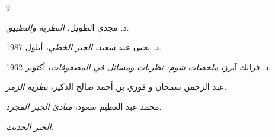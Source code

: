 \begin{thebibliography}{9}
	
	د. مجدي الطويل، \textit{النظرية والتطبيق}.
	
	د. يحيى عبد سعيد، \textit{الجبر الخطي}، أيلول 1987.
	
	د. فرانك آيرز، \textit{ملخصات شوم: نظريات ومسائل في المصفوفات}، أكتوبر 1962.
	
	عبد الرحمن سمحان و فوزي بن أحمد صالح الذكير، \textit{نظرية الزمر}.
	
	محمد عبد العظيم سعود، \textit{مبادئ الجبر المجرد}.
	
	\textit{الجبر الحديث}.
	
\end{thebibliography}